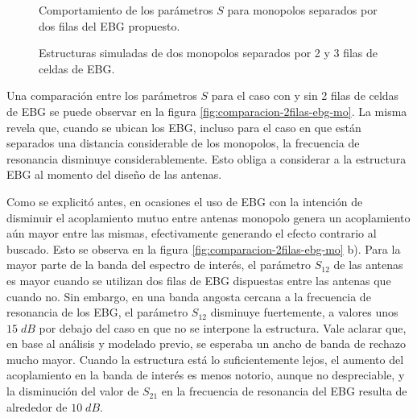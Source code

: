 \begin{figure}[h]
	\centering 
	\hspace{0pt}
	\caption{Comportamiento de los parámetros $S$ para monopolos separados por dos filas del EBG propuesto.}
	\label{fig:parametros-s-2ebg}
\end{figure}

\begin{figure}[h]
	\centering 
	\hspace{0pt}
	\caption{Estructuras simuladas de dos monopolos separados por 2 y 3 filas de celdas de EBG.}
	\label{fig:estructuras2-y-3-ebg-monopolos}
\end{figure} 

Una comparación entre los parámetros $S$ para el caso con y sin 2 filas de celdas de EBG se puede observar en la figura \ref{fig:comparacion-2filas-ebg-mo}. La misma revela que, cuando se ubican los EBG, incluso para el caso en que están separados una distancia considerable de los monopolos, la frecuencia de resonancia disminuye considerablemente. Esto obliga a considerar a la estructura EBG al momento del diseño de las antenas.

Como se explicitó antes, en ocasiones el uso de EBG con la intención de disminuir el acoplamiento mutuo entre antenas monopolo genera un acoplamiento aún mayor entre las mismas, efectivamente generando el efecto contrario al buscado. Esto se observa en la figura \ref{fig:comparacion-2filas-ebg-mo} b). Para la mayor parte de la banda del espectro de interés, el parámetro $S_{12}$ de las antenas es mayor cuando se utilizan dos filas de EBG dispuestas entre las antenas que cuando no. Sin embargo, en una banda angosta cercana a la frecuencia de resonancia de los EBG, el parámetro $S_{12}$ disminuye fuertemente, a valores unos $15\; dB$ por debajo del caso en que no se interpone la estructura. Vale aclarar que, en base al análisis y modelado previo, se esperaba un ancho de banda de rechazo mucho mayor. Cuando la estructura está lo suficientemente lejos, el aumento del acoplamiento en la banda de interés es menos notorio, aunque no despreciable, y la disminución del valor de $S_{21}$ en la frecuencia de resonancia del EBG resulta de alrededor de $10\; dB$.

